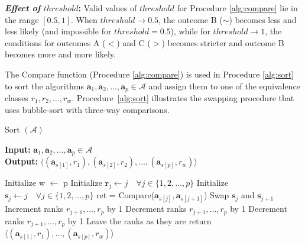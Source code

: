 \documentclass[conference]{IEEEtran}
\begin{document}
\textbf{\textit{Effect of }$threshold$:} Valid values of $threshold$ for Procedure \ref{alg:compare} lie in the range $[0.5,1]$. When $threshold \to 0.5$, the outcome B ($\sim$) becomes
less and less likely (and impossible for $threshold=0.5$), while for $threshold \to 1$, the conditions for outcomes A ($<$)
and C ($>$) becomes stricter and outcome B becomes more and more likely. 

The Compare function (Procedure \ref{alg:compare}) is used in Procedure \ref{alg:sort} to sort the algorithms $\mathbf{a}_1,\mathbf{a}_2, \dots, \mathbf{a}_p \in \mathcal{A}$ and assign them to one of the equivalence classes $r_1, r_2, \dots, r_w$.
Procedure~\ref{alg:sort} illustrates the swapping procedure that uses bubble-sort\cite{bubblesort} with three-way comparisons.
\begin{algorithm}
	\caption{Sort $(\mathcal{A})$ }
	\label{alg:sort}
	\hspace*{\algorithmicindent} \textbf{Input: } $ \mathbf{a}_1,\mathbf{a}_2,\dots,\mathbf{a}_p \in \mathcal{A}$ \\
	\hspace*{\algorithmicindent} \textbf{Output: } $ \langle (\mathbf{a}_{s[1]},r_1), (\mathbf{a}_{s[2]}, r_2), \dots, (\mathbf{a}_{s[p]},r_w) \rangle $
	\begin{algorithmic}[1] 
		\State Initialize w $\leftarrow$ p
		\State Initialize $\mathbf{r}_j \leftarrow j \quad \forall j \in \{1,2,\dots,p\}$ 
		\State Initialize $\mathbf{s}_j \leftarrow j \quad \forall j \in \{1,2,\dots,p\}$ 
		\State ret = Compare($\mathbf{a}_{s[j]}, \mathbf{a}_{s[j+1]}$)
		\State Swap $\mathbf{s}_{j}$ and $\mathbf{s}_{j+1}$ \label{lst:swap}
		 \label{lst:h1}
		\State Increment ranks $r_{j+1}, \dots, r_p$ by 1 \label{lst:h2}
		\EndIf
		\Else
		 \label{lst:gg1}
		\State Decrement ranks $r_{j+1}, \dots, r_p$ by 1 \label{lst:gg2}
		\EndIf
		\EndIf
		 \label{lst:ag1}
		\State Decrement ranks $r_{j+1}, \dots, r_p$ by 1 \label{lst:ag2}
		\EndIf
		\State Leave the ranks as they are
		\EndIf		
		\EndFor
		\EndFor
		\State return $\langle (\mathbf{a}_{s[1]},r_1), \dots, (\mathbf{a}_{s[p]},r_w) \rangle$
              \end{algorithmic}
            \end{algorithm}
\end{document}
